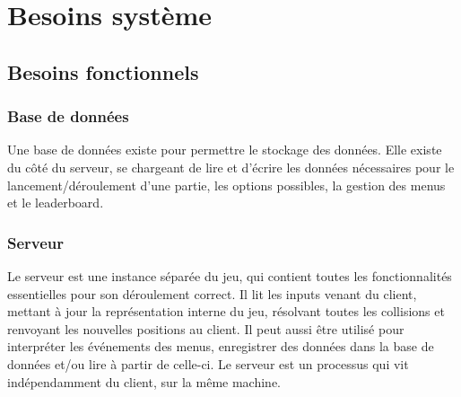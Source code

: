 \documentclass[french]{article}
\begin{document}
\section{Besoins système}
\subsection{Besoins fonctionnels}
\subsubsection{Base de données} Une base de données existe pour permettre le stockage des données.  
Elle existe du côté du serveur, se chargeant de lire et d'écrire les données nécessaires pour le lancement/déroulement d'une partie, les options possibles, la gestion des menus et le leaderboard.
\subsubsection{Serveur} 
Le serveur est une instance séparée du jeu, qui contient toutes les fonctionnalités essentielles pour son déroulement correct. Il lit les inputs venant du client, mettant à jour la représentation interne du jeu, résolvant toutes les collisions et renvoyant les nouvelles positions au client. Il peut aussi être utilisé pour interpréter les événements des menus, enregistrer des données dans la base de données et/ou lire à partir de celle-ci. 
Le serveur est un processus qui vit indépendamment du client, sur la même machine.
\end{document}

